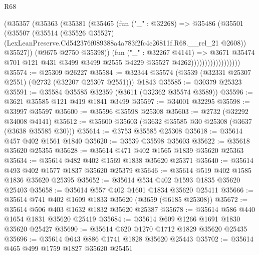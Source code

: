 \begin{lexlean}{R68}
\begin{coremodule}
                              (@35357
                                (@35363
                                  (@35381
                                    (@35465
                                      (fun ("_" : @32268) =>
                                      @35486
                                        (@35501
                                          (@35507
                                            (@35514
                                              (@35526 @35527)
                                              (LexLeanPreserve.Cd542376f089388a4a783f2fc4c26811f.R68.__rel_21
                                                @2608))
                                            @35527))
                                        (@9675 @2750 @35398))
                                      (fun ("_" : @32267 @4141) =>
                                      @3671
                                        @35474
                                        @701
                                        @121
                                        @431
                                        @3499
                                        @3499
                                        @2555
                                        @4229
                                        @35527
                                        @4262))))))))))))))))))
@35574 := @25309 @26227
@35584 := @32344 @35574 (@3539 (@32331 @25307 @2551) (@2732 (@32207 @25307 @2551))) @1843
@35585 := @30379 @25323
@35591 := @35584 @35585 @32359 (@3611 (@32362 @35574 @3589))
@35596 := @3621 @35585 @121 @419 @1841 @3499
@35597 := @34001 @32295
@35598 := @33997 @35597
@35600 := @35596 @35598 @25308
@35603 := @2732 (@32292 @34008 @4141)
@35612 := @35600 @35603 (@3632 @35585 @30 @25308 (@3637 (@3638 @35585 @30)))
@35614 := @3753 @35585 @25308
@35618 := @35614 @457 @402 @1561 @1840
@35620 := @3539 @35598 @35603
@35622 := @35618 @35620 @25355
@35628 := @35614 @471 @402 @1565 @1839 @35620 @25363
@35634 := @35614 @482 @402 @1569 @1838 @35620 @25371
@35640 := @35614 @493 @402 @1577 @1837 @35620 @25379
@35646 := @35614 @519 @402 @1585 @1836 @35620 @25395
@35652 := @35614 @534 @402 @1593 @1835 @35620 @25403
@35658 := @35614 @557 @402 @1601 @1834 @35620 @25411
@35666 := @35614 @741 @402 @1609 @1833 @35620 (@3659 (@6185 @25308))
@35672 := @35614 @506 @403 @1632 @1832 @35620 @25387
@35678 := @35614 @586 @440 @1654 @1831 @35620 @25419
@35684 := @35614 @609 @1266 @1691 @1830 @35620 @25427
@35690 := @35614 @620 @1270 @1712 @1829 @35620 @25435
@35696 := @35614 @643 @886 @1741 @1828 @35620 @25443
@35702 := @35614 @465 @499 @1759 @1827 @35620 @25451

\end{coremodule}
\end{lexlean}
